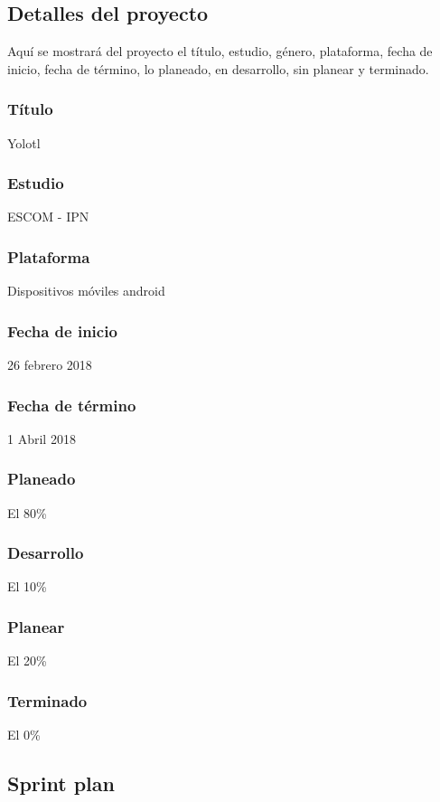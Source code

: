 \subsection{Detalles del proyecto}
Aquí se mostrará del proyecto el título, estudio, género, plataforma, fecha de inicio, fecha de término, lo planeado, en desarrollo, sin planear y terminado.
\\
\subsubsection{Título}
Yolotl

\subsubsection{Estudio}
ESCOM - IPN

\subsubsection{Plataforma}
Dispositivos móviles android

\subsubsection{Fecha de inicio}
26 febrero 2018

\subsubsection{Fecha de término}
1 Abril 2018
\subsubsection{Planeado}
El 80\%
\subsubsection{Desarrollo}
El 10\%
\subsubsection{Planear}
El 20\%
\subsubsection{Terminado}
El 0\%



\subsection{Sprint plan}
